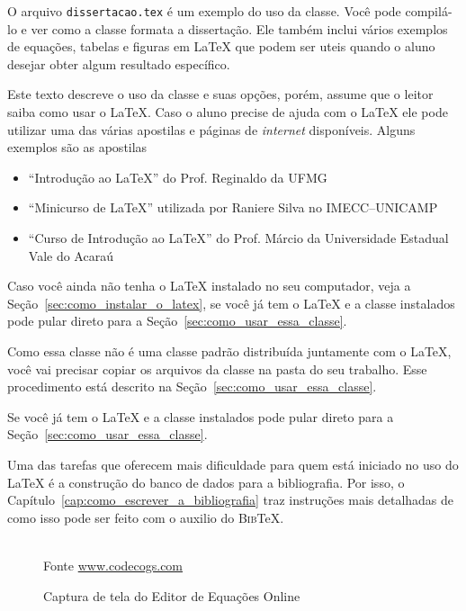 \documentclass[fleqn]{profmat-cefet}
\newcommand{\BibTeX}   {\textsc{Bib}\TeX}
\newcommand{\texfile}  {\texttt{dissertacao.tex}}
\begin{document}
O arquivo \texfile{} é um exemplo do uso da classe. Você pode
compilá-lo e ver como a classe formata a dissertação. Ele também inclui vários
exemplos de equações, tabelas e figuras em \LaTeX{} que podem ser uteis
quando o aluno desejar obter algum resultado específico.

Este texto descreve o uso da classe e suas opções, porém, assume que o
leitor saiba como usar o \LaTeX{}. Caso o aluno precise de ajuda com o \LaTeX{}
ele pode utilizar uma das várias apostilas e páginas de \emph{internet} disponíveis.
Alguns exemplos são as apostilas
\begin{itemize}
    \item ``Introdução ao \LaTeX{}'' do Prof. Reginaldo da UFMG \cite{REGINALDO:LATEX}
    \item ``Minicurso de \LaTeX{}'' utilizada por Raniere Silva no IMECC--UNICAMP \cite{RANIERE:LATEX}
    \item ``Curso de Introdução ao \LaTeX{}'' do Prof. Márcio da Universidade Estadual Vale do Acaraú \cite{MARCIO:LATEX}
\end{itemize}

Caso você ainda não tenha o \LaTeX{} instalado no seu computador, veja a
Seção~\ref{sec:como_instalar_o_latex}, 
se você já tem o \LaTeX{} e a classe instalados pode pular direto para a
Seção~\ref{sec:como_usar_essa_classe}.

Como essa classe não é uma classe padrão
distribuída juntamente com o \LaTeX{}, você vai precisar copiar os arquivos da
classe na pasta do seu trabalho. Esse procedimento está descrito na
Seção~\ref{sec:como_usar_essa_classe}.

Se você já tem o \LaTeX{} e a classe instalados pode pular direto para a
Seção~\ref{sec:como_usar_essa_classe}.

Uma das tarefas que oferecem mais dificuldade para quem está iniciado no uso do
\LaTeX{} é a construção do banco de dados para a bibliografia.  Por isso, o
Capítulo~\ref{cap:como_escrever_a_bibliografia} traz instruções mais detalhadas
de como isso pode ser feito com o auxilio do \BibTeX{}.

\begin{figure}
	\centering
	\caption{Captura de tela do Editor de Equações Online}
	\label{fig:editor-equacoes}
	\\ Fonte \url{www.codecogs.com}
\end{figure}
\end{document}
